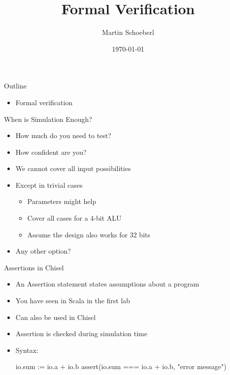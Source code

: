 

\newif\ifbook


\usepackage{tikz}
\usetikzlibrary{positioning, arrows.meta}


\title{Formal Verification}
\author{Martin Schoeberl}
\date{\today}



\begin{frame}
\titlepage
\end{frame}




\begin{frame}[fragile]{Outline}
\begin{itemize}

\item Formal verification

\end{itemize}
\end{frame}


\begin{frame}[fragile]{When is Simulation Enough?}
\begin{itemize}
\item How much do you need to test?
\item How confident are you?
\item We cannot cover all input possibilities
\item Except in trivial cases
\begin{itemize}
\item Parameters might help
\item Cover all cases for a 4-bit ALU
\item Assume the design also works for 32 bits 
\end{itemize}
\item Any other option?
\end{itemize}
\end{frame}

\begin{frame}[fragile]{Assertions in Chisel}
\begin{itemize}
\item An Assertion statement states assumptions about a program
\item You have seen  in Scala in the first lab
\item Can also be used in Chisel
\item Assertion is checked during simulation time
\item Syntax:
\begin{chisel}
  io.sum := io.a + io.b
  assert(io.sum === io.a + io.b, "error message")
\end{chisel}
\end{itemize}
\end{frame}

